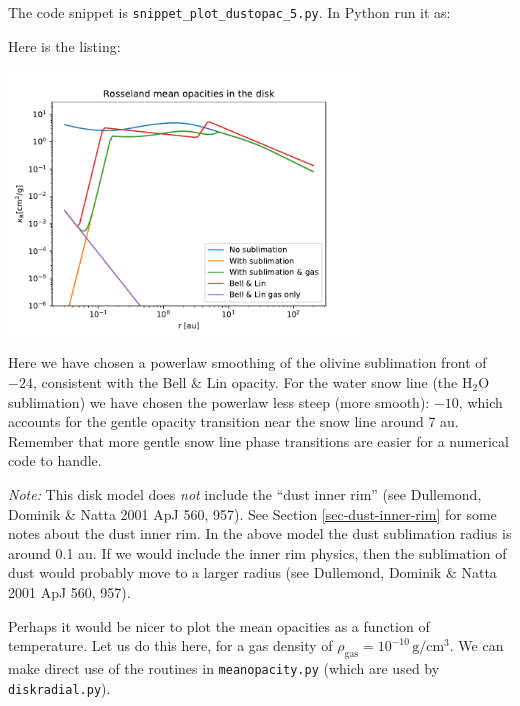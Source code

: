 \documentclass{book}
\newcommand{\code}[1]{{\small\tt #1}}
\begin{document}
The code snippet is
\code{snippet\_plot\_dustopac\_5.py}. In Python run it as:
\begin{codebox}
\end{codebox}
Here is the listing:

\centerline{\includegraphics[width=0.7\textwidth]{../snippets/fig_snippet_plot_dustopac_5_1.pdf}}

Here we have chosen a powerlaw smoothing of the olivine sublimation front of
$-24$, consistent with the Bell \& Lin opacity. For the water snow line
(the H$_2$O sublimation) we have chosen the powerlaw less steep (more smooth):
$-10$, which accounts for the gentle opacity transition near the snow line
around 7 au. Remember that more gentle snow line phase transitions are
easier for a numerical code to handle.

{\em Note:} This disk model does {\em not} include the ``dust inner rim'' (see
Dullemond, Dominik \& Natta 2001 ApJ 560, 957). See Section
\ref{sec-dust-inner-rim} for some notes about the dust inner rim.  In the above
model the dust sublimation radius is around 0.1 au.  If we would include the
inner rim physics, then the sublimation of dust would probably move to a larger
radius (see Dullemond, Dominik \& Natta 2001 ApJ 560, 957).

Perhaps it would be nicer to plot the mean opacities as a function of
temperature. Let us do this here, for a gas density of
$\rho_{\mathrm{gas}}=10^{-10}\,\mathrm{g}/\mathrm{cm}^3$. We can make
direct use of the routines in \code{meanopacity.py} (which are used
by \code{diskradial.py}).
\end{document}
